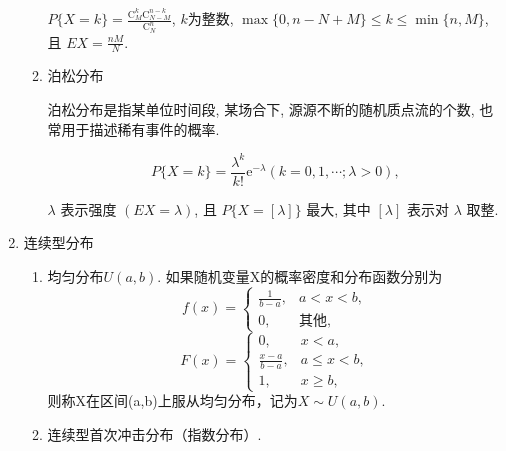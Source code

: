 \begin{enumerate}
\begin{enumerate}
                        $P\{X=k\}=\frac{\mathrm{C}_{M}^{k} \mathrm{C}_{N-M}^{n-k}}{\mathrm{C}_{N}^{n}}$, $k$为整数, $\max \{0, n-N+M\} \leqslant k \leqslant \min \{n, M\}$, 且 $E X=\frac{n M}{N}$.
                  \item 泊松分布

                        泊松分布是指某单位时间段, 某场合下, 源源不断的随机质点流的个数, 也常用于描述稀有事件的概率.

                        $$P\{X=k\}=\frac{\lambda^{k}}{k !} \mathrm{e}^{-\lambda}(k=0,1, \cdots ; \lambda>0),$$

                        $\lambda$ 表示强度 $(E X=\lambda)$, 且 $P\{X=[\lambda]\}$ 最大, 其中 $[\lambda]$ 表示对 $\lambda$ 取整.
            \end{enumerate}

      \item 连续型分布
            \begin{enumerate}
                  \item 均匀分布$U(a,b)$.
                        如果随机变量X的概率密度和分布函数分别为
                        $$f(x)=\begin{cases}
                                    \frac{1}{b-a}, & a<x<b,     \\
                                    0,             & \text{其他},
                              \end{cases}$$
                        $$F(x)=\begin{cases}
                                    0,               & x<a,            \\
                                    \frac{x-a}{b-a}, & a\leqslant x<b, \\
                                    1,               & x\geqslant b,
                              \end{cases}$$
                        则称X在区间(a,b)上服从均匀分布，记为$X\sim U(a,b)$.
                  \item 连续型首次冲击分布（指数分布）.


\end{enumerate}
\end{enumerate}
